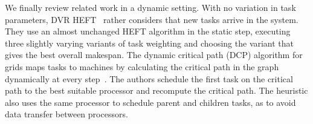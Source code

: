 \documentclass[conference]{IEEEtran}
\begin{document}
\smallskip
{}
We finally review related work in a dynamic setting. With no variation in task parameters, 
    DVR HEFT~\cite{SANDOKJI2019482} rather considers that new tasks arrive in the system. 
    They use an almost unchanged HEFT algorithm in the static step, executing three slightly
    varying variants of task weighting and choosing the variant that gives the best overall makespan.
%
    The dynamic critical path (DCP) algorithm for grids maps tasks to machines
    by calculating the critical path in the graph dynamically at every step~\cite{rahman2013}.
    The authors schedule the first task on the critical path to the best suitable processor and recompute the critical path.
    The heuristic also uses the same processor to schedule parent and children tasks, as to avoid data transfer between processors.
\end{document}
